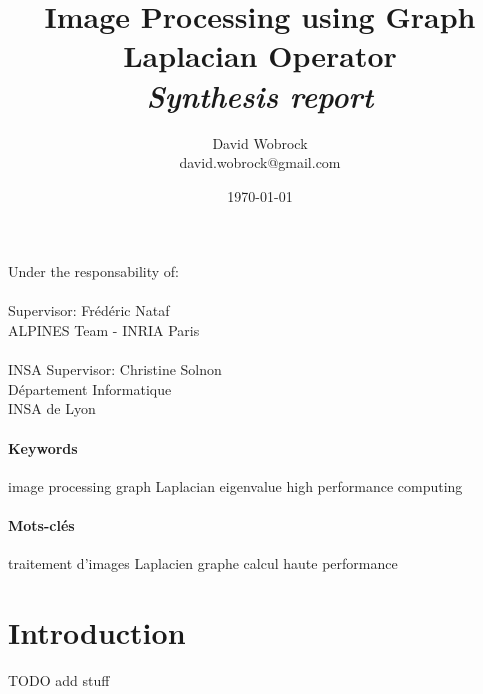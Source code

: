 \documentclass[]{article}
\title{Image Processing using Graph Laplacian Operator \\ \textit{Synthesis report}}
\author{David Wobrock \\ david.wobrock@gmail.com}
\date{\today}
\begin{document}
\maketitle

Under the responsability of:\\ \\
Supervisor: Frédéric Nataf\\
ALPINES Team - INRIA Paris\\ \\
INSA Supervisor: Christine Solnon\\
Département Informatique\\
INSA de Lyon

\begin{abstract}
 
\end{abstract}

\paragraph{Keywords}
image processing graph Laplacian eigenvalue high performance computing

\begin{otherlanguage}{french}
  \begin{abstract}
   
  \end{abstract}
\end{otherlanguage}

\paragraph{Mots-clés}
traitement d'images Laplacien graphe calcul haute performance

\section{Introduction}
TODO add stuff

\printbibliography
\end{document}

